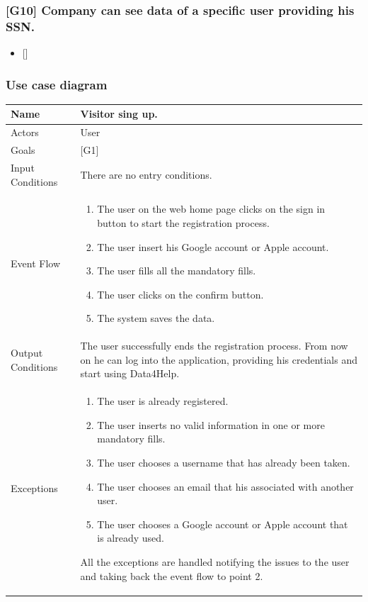 \documentclass{article}
\begin{document}
\subsubsection{[G10] Company can see data of a specific user providing his SSN.}
\begin{itemize}
\item {[]}
\end{itemize}
\subsubsection{Use case diagram}

\begin{center}
    \begin{tabular}{ | l | p{10cm} |}
    \hline
    Name & Visitor sing up.\\ \hline
    Actors & User\\ \hline
   	Goals & {[G1]}\\ \hline
    Input Conditions & There are no entry conditions.\\ \hline
    Event Flow & \begin{enumerate}
    	\item The user on the web home page clicks on the sign in button to start the registration process.
    	\item The user insert his Google account or Apple account.
    	\item The user fills all the mandatory fills.
		\item The user clicks on the confirm button.
		\item The system saves the data.
    \end{enumerate} \\ \hline
    Output Conditions & The user successfully ends the registration process. From now on he can log into the application, providing his credentials and start using Data4Help. \\ \hline
    Exceptions & \begin{enumerate}
    	\item The user is already registered.
		\item The user inserts no valid information in one or more mandatory fills.
		\item The user chooses a username that has already been taken. 
		\item The user chooses an email that his associated with another user.
		\item The user chooses a Google account or Apple account that is already used.
	\end{enumerate}
All the exceptions are handled notifying the issues to the user and taking back the event flow to point 2.
    \\ \hline
    \end{tabular}
\end{center}
\end{document}
